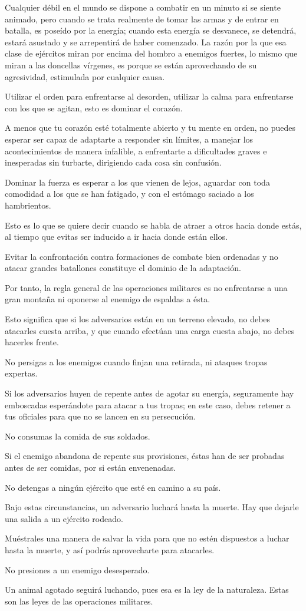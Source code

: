 Cualquier débil en el mundo se dispone a combatir en un minuto si se siente animado, pero cuando se trata realmente de tomar las armas y de entrar en batalla, es poseído por la energía; cuando esta energía se desvanece, se detendrá, estará asustado y se arrepentirá de haber comenzado. La razón por la que esa clase de ejércitos miran por encima del hombro a enemigos fuertes, lo mismo que miran a las doncellas vírgenes, es porque se están aprovechando de su agresividad, estimulada por cualquier causa.

Utilizar el orden para enfrentarse al desorden, utilizar la calma para enfrentarse con los que se agitan, esto es dominar el corazón.

A menos que tu corazón esté totalmente abierto y tu mente en orden, no puedes esperar ser capaz de adaptarte a responder sin límites, a manejar los acontecimientos de manera infalible, a enfrentarte a dificultades graves e inesperadas sin turbarte, dirigiendo cada cosa sin confusión.

Dominar la fuerza es esperar a los que vienen de lejos, aguardar con toda comodidad a los que se han fatigado, y con el estómago saciado a los hambrientos.

Esto es lo que se quiere decir cuando se habla de atraer a otros hacia donde estás, al tiempo que evitas ser inducido a ir hacia donde están ellos.

Evitar la confrontación contra formaciones de combate bien ordenadas y no atacar grandes batallones constituye el dominio de la adaptación.

Por tanto, la regla general de las operaciones militares es no enfrentarse a una gran montaña ni oponerse al enemigo de espaldas a ésta.

Esto significa que si los adversarios están en un terreno elevado, no debes atacarles cuesta arriba, y que cuando efectúan una carga cuesta abajo, no debes hacerles frente.

No persigas a los enemigos cuando finjan una retirada, ni ataques tropas expertas.

Si los adversarios huyen de repente antes de agotar su energía, seguramente hay emboscadas esperándote para atacar a tus tropas; en este caso, debes retener a tus oficiales para que no se lancen en su persecución.

No consumas la comida de sus soldados.

Si el enemigo abandona de repente sus provisiones, éstas han de ser probadas antes de ser comidas, por si están envenenadas.

No detengas a ningún ejército que esté en camino a su país.

Bajo estas circunstancias, un adversario luchará hasta la muerte. Hay que dejarle una salida a un ejército rodeado.

Muéstrales una manera de salvar la vida para que no estén dispuestos a luchar hasta la muerte, y así podrás aprovecharte para atacarles.

No presiones a un enemigo desesperado.

Un animal agotado seguirá luchando, pues esa es la ley de la naturaleza. Estas son las leyes de las operaciones militares.
